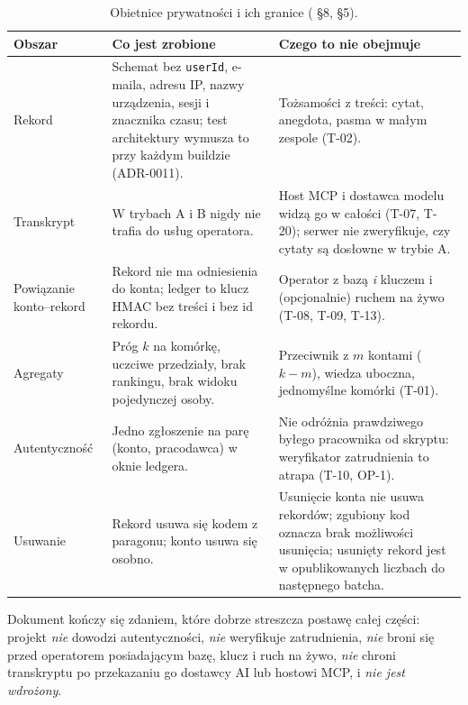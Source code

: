 \begin{table}[htbp]
\centering
\small
\begin{tabularx}{\linewidth}{@{}>{\raggedright\arraybackslash}p{3.7cm}>{\raggedright\arraybackslash}X>{\raggedright\arraybackslash}X@{}}
\toprule
\textbf{Obszar} & \textbf{Co jest zrobione} & \textbf{Czego to nie obejmuje} \\
\midrule
Rekord &
Schemat bez \texttt{userId}, e-maila, adresu IP, nazwy urządzenia, sesji i
znacznika czasu; test architektury wymusza to przy każdym buildzie
(ADR-0011). &
Tożsamości z treści: cytat, anegdota, pasma w małym zespole (T-02). \\
\addlinespace
Transkrypt &
W trybach A i B nigdy nie trafia do usług operatora. &
Host MCP i dostawca modelu widzą go w całości (T-07, T-20); serwer nie
zweryfikuje, czy cytaty są dosłowne w trybie A. \\
\addlinespace
Powiązanie konto--rekord &
Rekord nie ma odniesienia do konta; ledger to klucz HMAC bez treści i bez id
rekordu. &
Operator z bazą \emph{i} kluczem i (opcjonalnie) ruchem na żywo (T-08, T-09,
T-13). \\
\addlinespace
Agregaty &
Próg $k$ na komórkę, uczciwe przedziały, brak rankingu, brak widoku
pojedynczej osoby. &
Przeciwnik z $m$ kontami ($k-m$), wiedza uboczna, jednomyślne komórki (T-01). \\
\addlinespace
Autentyczność &
Jedno zgłoszenie na parę (konto, pracodawca) w oknie ledgera. &
Nie odróżnia prawdziwego byłego pracownika od skryptu: weryfikator zatrudnienia
to atrapa (T-10, OP-1). \\
\addlinespace
Usuwanie &
Rekord usuwa się kodem z paragonu; konto usuwa się osobno. &
Usunięcie konta nie usuwa rekordów; zgubiony kod oznacza brak możliwości
usunięcia; usunięty rekord jest w opublikowanych liczbach do następnego batcha. \\
\bottomrule
\end{tabularx}
\caption{Obietnice prywatności i ich granice ( §8,  §5).}
\label{tab:p3-gwarancje}
\end{table}

Dokument  kończy się zdaniem, które dobrze streszcza
postawę całej części: projekt \emph{nie} dowodzi autentyczności, \emph{nie}
weryfikuje zatrudnienia, \emph{nie} broni się przed operatorem posiadającym
bazę, klucz i ruch na żywo, \emph{nie} chroni transkryptu po przekazaniu go
dostawcy AI lub hostowi MCP, i \emph{nie jest wdrożony}.

